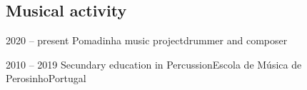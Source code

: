 \documentclass[11pt,a4paper]{moderncv}
\begin{document}
\subsection{Musical activity}
\cventry
	{2020 -- present}
	{Pomadinha music project}{}{}{drummer and composer}{}

\cventry
	{2010 -- 2019}
	{Secundary education in Percussion}{Escola de Música de Perosinho}{Portugal}{}{}
        

        



\end{document}
